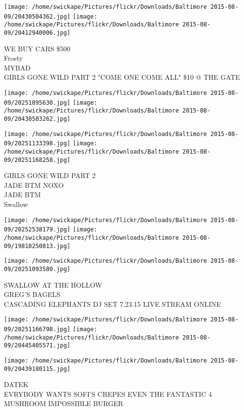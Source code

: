 \documentclass[10pt,letterpaper]{article}
\begin{document}
\texttt{[image: /home/swickape/Pictures/flickr/Downloads/Baltimore 2015-08-09/20430504362.jpg]}
\texttt{[image: /home/swickape/Pictures/flickr/Downloads/Baltimore 2015-08-09/20412940006.jpg]}

WE BUY CARS \$500\\
Frosty\\
MYBAD\\
GIRLS GONE WILD PART 2 "COME ONE COME ALL" \$10 @ THE GATE\\
\pagebreak

\texttt{[image: /home/swickape/Pictures/flickr/Downloads/Baltimore 2015-08-09/20251095630.jpg]}
\texttt{[image: /home/swickape/Pictures/flickr/Downloads/Baltimore 2015-08-09/20430503262.jpg]}

\texttt{[image: /home/swickape/Pictures/flickr/Downloads/Baltimore 2015-08-09/20251133398.jpg]}
\texttt{[image: /home/swickape/Pictures/flickr/Downloads/Baltimore 2015-08-09/20251168258.jpg]}

GIRLS GONE WILD PART 2\\
JADE BTM NOXO\\
JADE BTM\\
Swallow\\
\pagebreak

\texttt{[image: /home/swickape/Pictures/flickr/Downloads/Baltimore 2015-08-09/20252538179.jpg]}
\texttt{[image: /home/swickape/Pictures/flickr/Downloads/Baltimore 2015-08-09/19818250813.jpg]}

\vspace{0.25in}
\texttt{[image: /home/swickape/Pictures/flickr/Downloads/Baltimore 2015-08-09/20251093580.jpg]}

SWALLOW AT THE HOLLOW\\
GREG'S BAGELS\\
CASCADING ELEPHANTS DJ SET 7.23.15 LIVE STREAM ONLINE\\
\pagebreak

\texttt{[image: /home/swickape/Pictures/flickr/Downloads/Baltimore 2015-08-09/20251166798.jpg]}
\texttt{[image: /home/swickape/Pictures/flickr/Downloads/Baltimore 2015-08-09/20445405571.jpg]}

\texttt{[image: /home/swickape/Pictures/flickr/Downloads/Baltimore 2015-08-09/20439180115.jpg]}

DATEK\\
EVRYBODY WANTS SOFI'S CREPES EVEN THE FANTASTIC 4\\
MUSHROOM IMPOSSIBLE BURGER\\
\pagebreak
\end{document}
